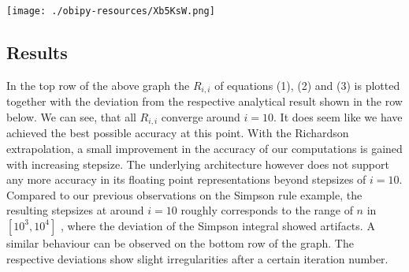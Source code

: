 \documentclass[11pt]{article}
\begin{document}
\begin{center}
\texttt{[image: ./obipy-resources/Xb5KsW.png]}
\end{center}

\subsection{Results}
\label{sec:orgbdc6731}
In the top row of the above graph the \(R_{i,i}\) of equations (1), (2) and (3) is plotted 
together with the deviation from the respective analytical result shown in the row below. 
We can see, that all \(R_{i,i}\) converge around \(i=10\). 
It does seem like we have achieved the best possible accuracy at this point. 
With the Richardson extrapolation, a small improvement in the accuracy of our computations is gained 
with increasing stepsize. The underlying architecture however does not support any more accuracy in its 
floating point representations beyond stepsizes of \(i=10\). 
Compared to our previous observations on the Simpson rule example, the resulting stepsizes 
at around \(i=10\) roughly corresponds to the range of \(n\) in \([10^3, 10^4]\) ,
where the deviation of the Simpson integral showed artifacts. 
A similar behaviour can be observed on the bottom row of the graph. 
The respective deviations show slight irregularities after a certain iteration number.
\end{document}
